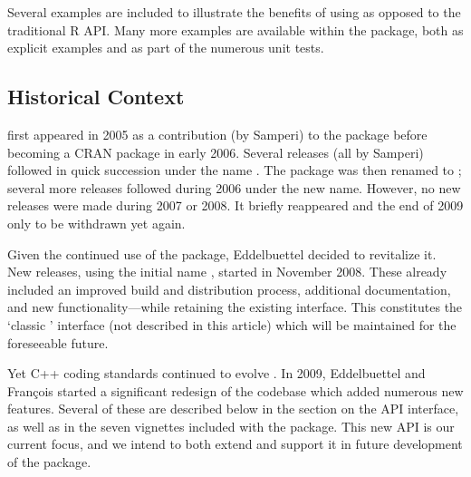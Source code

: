 Several examples are included to illustrate the benefits of using 
as opposed to the traditional R API. Many more examples are available within
the package, both as explicit examples and as part of the numerous unit tests.

\subsection{Historical Context}

 first appeared in 2005 as a contribution (by Samperi) to the
 package \citep{cran:rquantlib} before becoming a CRAN package
in early 2006. Several releases (all by Samperi) followed in quick succession
under the name . The package was then renamed to
; several more releases followed during 2006 under the new
name.  However, no new releases were made during 2007 or 2008. It briefly
reappeared and the end of 2009 only to be withdrawn yet again. 

Given the continued use of the package, Eddelbuettel decided to revitalize it. New
releases, using the initial name , started in November 2008. These
already included an improved build and distribution process, additional
documentation, and new functionality---while retaining the existing
interface.  This constitutes the `classic ' interface 
(not described in this article) which will be maintained for the foreseeable future.

Yet C++ coding standards continued to evolve \citep{meyers:effectivecplusplus}.
In 2009, Eddelbuettel and Fran\c{c}ois started a significant redesign of the
codebase which added numerous new features.  Several of these are described
below in the section on the  API interface, as well as in the
seven vignettes included with the package. This new API is our current focus,
and we intend to both extend and support it in future development of the
package. 

